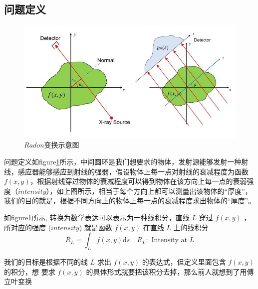 \documentclass[hyperref]{ctexart}
\begin{document}
		\subsection{问题定义}
			\begin{figure}[ht!]
				\centering
				\includegraphics[width=150mm]{Radon问题定义.png}
				\caption{$Radon$变换示意图 \label{Radon变换示意图}}
			\end{figure}
			
			问题定义如figure\ref{Radon变换示意图}所示，中间圆环是我们想要求的物体，发射源能够发射一种射线，感应器能够感应到射线的强弱，假设物体上每一点对射线的衰减程度为函数$f(x,y)$，根据射线穿过物体的衰减程度可以得到物体在该方向上每一点的衰弱强度（$intensity$），如上图所示，相当于每个方向上都可以测量出该物体的“厚度”，我们的目的就是，根据不同方向上的物体上每一点的衰减程度求出物体的“厚度”。

			如figure\ref{Radon变换示意图}所示, 转换为数学表达可以表示为一种线积分，直线 $L$ 穿过 $f(x, y)$ ，所对应的强度 ($intensity$) 就是函数 $f(x, y)$ 在直线 $L$ 上的线积分
			\begin{equation}
				R_{L}=\int_{L} f(x, y) \mathrm{d} s \quad R_{L}: \text { Intensity at } L
			\end{equation}

			我们的目标是根据不同的线 $L$ 求出 $f(x, y)$ 的表达式，但定义里面包含 $f(x, y)$ 的积分，想 要求 $f(x, y)$ 的具体形式就要把该积分去掉，那么前人就想到了用傅立叶变换
\end{document}
